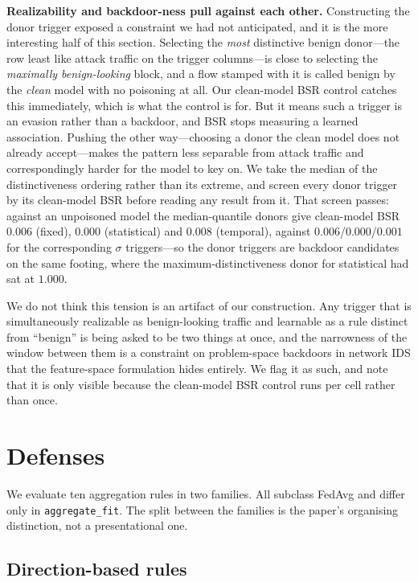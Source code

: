 \textbf{Realizability and backdoor-ness pull against each other.} Constructing
the donor trigger exposed a constraint we had not anticipated, and it is the more
interesting half of this section. Selecting the \emph{most} distinctive benign
donor---the row least like attack traffic on the trigger columns---is close to
selecting the \emph{maximally benign-looking} block, and a flow stamped with it
is called benign by the \emph{clean} model with no poisoning at all. Our
clean-model BSR control catches this immediately, which is what the control is
for. But it means such a trigger is an evasion rather than a backdoor, and BSR
stops measuring a learned association. Pushing the other way---choosing a donor
the clean model does not already accept---makes the pattern less separable from
attack traffic and correspondingly harder for the model to key on. We take the
median of the distinctiveness ordering rather than its extreme, and screen every
donor trigger by its clean-model BSR before reading any result from it. That
screen passes: against an unpoisoned model the median-quantile donors give
clean-model BSR $0.006$ (fixed), $0.000$ (statistical) and $0.008$ (temporal),
against $0.006$/$0.000$/$0.001$ for the corresponding $\sigma$ triggers---so the
donor triggers are backdoor candidates on the same footing, where the
maximum-distinctiveness donor for statistical had sat at $1.000$.

We do not think this tension is an artifact of our construction. Any trigger that
is simultaneously realizable as benign-looking traffic and learnable as a rule
distinct from ``benign'' is being asked to be two things at once, and the
narrowness of the window between them is a constraint on problem-space backdoors
in network IDS that the feature-space formulation hides entirely. We flag it as
such, and note that it is only visible because the clean-model BSR control runs
per cell rather than once.

\section{Defenses}

We evaluate ten aggregation rules in two families. All subclass FedAvg and
differ only in \texttt{aggregate\_fit}. The split between the families is the
paper's organising distinction, not a presentational one.

\subsection{Direction-based rules}

